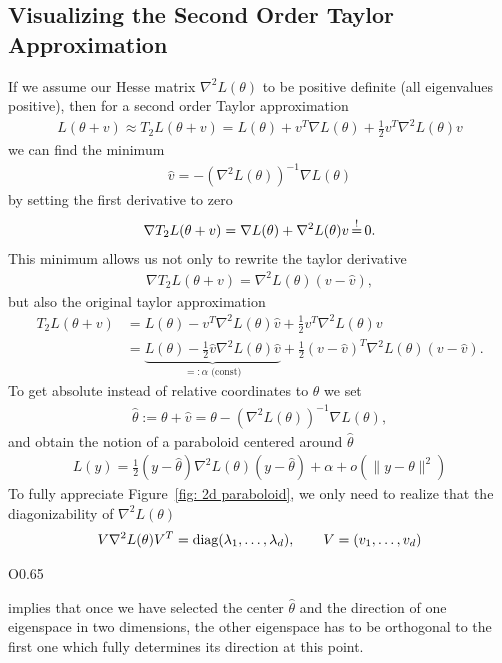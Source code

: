 \subsection{Visualizing the Second Order Taylor Approximation}
If we assume our Hesse matrix \(\nabla^2 L(\theta)\) to be positive definite
(all eigenvalues positive), then for a second order Taylor approximation
%
\begin{align*}
	L(\theta+v) \approx T_2L(\theta+v)
	= L(\theta) + v^T \nabla L(\theta) + \tfrac12 v^T \nabla^2 L(\theta) v
\end{align*}
%
we can find the minimum 
\begin{align*}
	\hat{v} = -(\nabla^2 L(\theta))^{-1}\nabla L(\theta)
\end{align*}
by setting the first derivative to zero
%
\begin{align*}
	\nabla T_2L(\theta+v) = \nabla L(\theta) + \nabla^2L(\theta) v \xeq{!} 0.
\end{align*}
%
This minimum allows us not only to rewrite the taylor derivative
%
\begin{align*}
	\nabla T_2L(\theta+v) = \nabla^2 L(\theta)(v-\hat{v}),
\end{align*}
%
but also the original taylor approximation
%
\begin{align*}
	T_2L(\theta+v)
	&= L(\theta) - v^T \nabla^2 L(\theta) \hat{v} + \tfrac12 v^T \nabla^2 L(\theta) v \\
	&= \underbrace{L(\theta) - \tfrac12 \hat{v} \nabla^2 L(\theta) \hat{v}}_{=: \alpha \text{ (const)}}
	+ \tfrac12 (v-\hat{v})^T \nabla^2 L(\theta)(v-\hat{v}).
\end{align*}
%
To get absolute instead of relative coordinates to \(\theta\) we set
%
\begin{align*}
	\hat{\theta} := \theta + \hat{v} = \theta -(\nabla^2 L(\theta))^{-1}\nabla L(\theta),
\end{align*}
%
and obtain the notion of a paraboloid centered around \(\hat{\theta}\)
%
\begin{align}\label{paraboloid approximation of L}
	L(y) = \tfrac12 (y- \hat{\theta}) \nabla^2 L(\theta) (y-\hat{\theta}) + \alpha + o(\|y-\theta\|^2)
\end{align}
%
To fully appreciate Figure~\ref{fig: 2d paraboloid}, we only need to realize
that the diagonizability of \(\nabla^2 L(\theta)\)
%
\begin{align}\label{diagnalization of the Hesse matrix}
	V \nabla^2 L(\theta) V^T
	= \text{diag}(\lambda_1,\dots,\lambda_d), \qquad V=(v_1,\dots, v_d)
\end{align}
%
\begin{wrapfigure}{O}{0.65\textwidth}
	\centering
	\def\svgwidth{0.65\textwidth}
	
	\caption{Assuming \(\hat{\theta}=0\), \(\lambda_1=1, \lambda_2=2\), \(v_1=(\sin(1), \cos(1))\)}
	\label{fig: 2d paraboloid}
\end{wrapfigure}
%
implies that once we have selected the center \(\hat{\theta}\) and the direction of
one eigenspace in two dimensions, the other eigenspace has to be
orthogonal to the first one which fully determines its direction at this point. 

